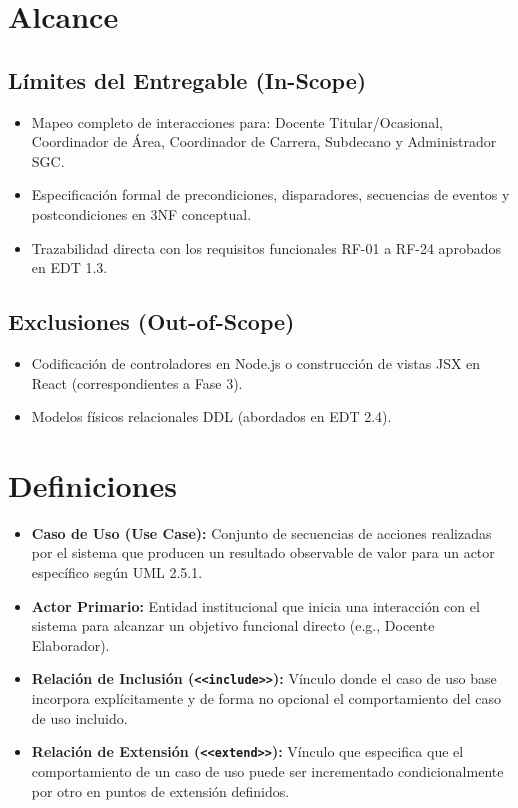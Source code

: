 \documentclass[12pt,a4paper]{article}
\begin{document}
\section{Alcance}
\subsection{Límites del Entregable (In-Scope)}
\begin{itemize}[leftmargin=1.5em, itemsep=2pt]
    \item Mapeo completo de interacciones para: Docente Titular/Ocasional, Coordinador de Área, Coordinador de Carrera, Subdecano y Administrador SGC.
    \item Especificación formal de precondiciones, disparadores, secuencias de eventos y postcondiciones en 3NF conceptual.
    \item Trazabilidad directa con los requisitos funcionales RF-01 a RF-24 aprobados en EDT 1.3.
\end{itemize}
\subsection{Exclusiones (Out-of-Scope)}
\begin{itemize}[leftmargin=1.5em, itemsep=2pt]
    \item Codificación de controladores en Node.js o construcción de vistas JSX en React (correspondientes a Fase 3).
    \item Modelos físicos relacionales DDL (abordados en EDT 2.4).
\end{itemize}

\section{Definiciones}
\begin{itemize}[leftmargin=1.5em, itemsep=2pt]
    \item \textbf{Caso de Uso (Use Case):} Conjunto de secuencias de acciones realizadas por el sistema que producen un resultado observable de valor para un actor específico según UML 2.5.1.
    \item \textbf{Actor Primario:} Entidad institucional que inicia una interacción con el sistema para alcanzar un objetivo funcional directo (e.g., Docente Elaborador).
    \item \textbf{Relación de Inclusión (\texttt{<<include>>}):} Vínculo donde el caso de uso base incorpora explícitamente y de forma no opcional el comportamiento del caso de uso incluido.
    \item \textbf{Relación de Extensión (\texttt{<<extend>>}):} Vínculo que especifica que el comportamiento de un caso de uso puede ser incrementado condicionalmente por otro en puntos de extensión definidos.
\end{itemize}
\end{document}
